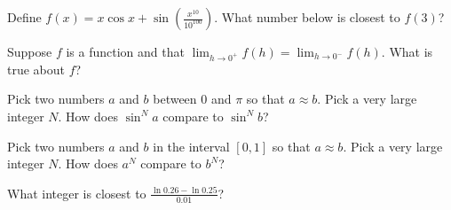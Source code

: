 \documentclass{ximera}
\newcommand{\recommendation}[1]{}
\begin{document}
\begin{shuffle}
\begin{problem}
  Define $f(x) = x \cos x + \sin\left(\frac{x^{10}}{10^{100}}\right)$.  What number below is closest to $f(3)$?
  \begin{multipleChoice}
  \end{multipleChoice}
\end{problem}

\begin{problem}

  Suppose $f$ is a function and that $\lim_{h \to 0^{+}} f(h) = \lim_{h \to 0^{-}} f(h)$.  What is true about $f$?
  \begin{multipleChoice}
  \end{multipleChoice}
\end{problem}

\begin{problem}
  Pick two numbers $a$ and $b$ between $0$ and $\pi$ so that
  $a \approx b$.  Pick a very large integer $N$.  How does $\sin^N a$
  compare to $\sin^N b$?
  \begin{multipleChoice}
  \end{multipleChoice}
\end{problem}

\begin{problem} 
  Pick two numbers $a$ and $b$ in the interval $[0,1]$ so that
  $a \approx b$.  Pick a very large integer $N$.  How does $a^N$
  compare to $b^N$?
  \begin{multipleChoice}
  \end{multipleChoice}
\end{problem}

\begin{problem}
  What integer is closest to $\frac{\ln 0.26 - \ln 0.25}{0.01}$?
  \begin{multipleChoice}
  \end{multipleChoice}
\end{problem}


\end{shuffle}
\end{document}
